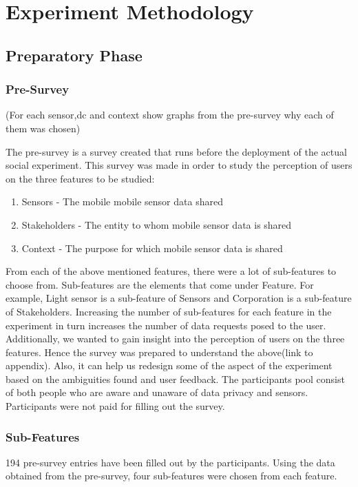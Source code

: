 \chapter{Experiment Methodology} \label{exp}

\section{Preparatory Phase}

\subsection{Pre-Survey}
(For each sensor,dc and context show graphs from the pre-survey why each of them was chosen)

The pre-survey  is a survey created that runs before the deployment of the actual social experiment. This
survey was made in order to study the perception of users on the three features to be studied:

\begin{enumerate}
    \item Sensors - The mobile mobile sensor data shared
    \item Stakeholders - The entity to whom mobile sensor data is shared
    \item Context - The purpose for which mobile sensor data is shared
\end{enumerate}

From each of the above mentioned features, there were a lot of sub-features to choose from. Sub-features are the elements that come under
Feature. For example, Light sensor is a sub-feature of Sensors and Corporation is a sub-feature of Stakeholders.
Increasing the number of sub-features for each feature in the experiment in turn increases the number of data requests posed to the user. Additionally,
we wanted to gain insight into the perception of users on the three features. Hence the survey
was prepared to understand the above(link to appendix). Also, it can help us redesign some of the aspect of the experiment based on the
ambiguities found and user feedback. The participants pool consist of both people who are aware and unaware of data privacy and sensors. Participants were not paid for filling out the survey.

\subsection{Sub-Features}
194 pre-survey entries have been filled out by the participants. Using the data obtained from the pre-survey, four sub-features were chosen from each
feature.

